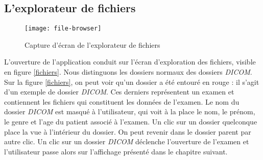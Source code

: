 \subsection{L'explorateur de fichiers}

\begin{figure}[h]
\begin{center}
    \texttt{[image: file-browser]}
\end{center}
    \caption{Capture d'écran de l'explorateur de fichiers}
    \label{fichiers}                      
\end{figure}

L'ouverture de l'application conduit sur l'écran d'exploration des fichiers, visible en figure \vref{fichiers}.
Nous distinguons les dossiers normaux des dossiers \emph{DICOM}. Sur la figure \vref{fichiers}, on peut voir qu'un dossier a été entouré en rouge : il s'agit d'un exemple de dossier \emph{DICOM}. Ces derniers représentent un examen et contiennent les fichiers qui constituent les données de l'examen. Le nom du dossier \emph{DICOM} est masqué à l'utilisateur, qui voit à la place le nom, le prénom, le genre et l'age du patient associé à l'examen.
Un clic sur un dossier quelconque place la vue à l'intérieur du dossier. On peut revenir dans le dossier parent par autre clic. Un clic sur un dossier \emph{DICOM} déclenche l'ouverture de l'examen et l'utilisateur passe alors sur l'affichage présenté dans le chapitre suivant.